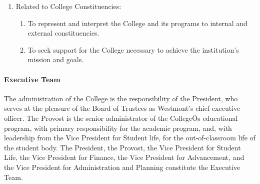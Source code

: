 \documentclass[letterpaper, 11pt]{article}
\begin{document}
\begin{enumerate}[label=\alph*)]
{\begin{enumerate}[label=\alph*)]
{\begin{enumerate}[label=\arabic*)]
{\begin{enumerate}[label=\alph*)]
										\item{To provide vision and leadership for the faculty and administration in formulating educational and support programs.}
										\item{To oversee the operation and development of the institution as a whole.}
										\item{To supervise the Vice Presidents in the performance of their duties.}
										\item{To make final review and give final administrative approval of College plans, budgets, and policies and to submit appropriate items to the Board of Trustees for adoption.}
									\end{enumerate}
								}
								\item{Related to College Constituencies:
									\begin{enumerate}[label=\alph*)]
										\item{To represent and interpret the College and its programs to internal and external constituencies.}
										\item{To seek support for the College necessary to achieve the institution's mission and goals.}
									\end{enumerate}
								}
							\end{enumerate}
						}
					\end{enumerate}
					}
			\end{enumerate}
			\paragraph{Executive Team}

				The administration of the College is the responsibility of the President, who serves at the pleasure of the Board of Trustees as Westmont's chief executive officer.  The Provost is the senior administrator of the CollegeÕs educational program, with primary responsibility for the academic program, and, with leadership from the Vice President for Student life, for the out-of-classroom life of the student body.  The President, the Provost, the Vice President for Student Life, the Vice President for Finance, the Vice President for Advancement, and the Vice President for Administration and Planning constitute the Executive Team.
\end{document}
